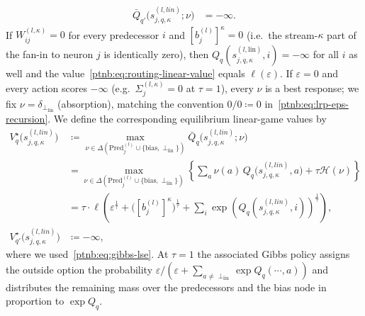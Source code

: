\begin{definition}
\begin{align}
    \bar Q_{q'} \bigl( s_{j,q,\kappa}^{(l, lin)};\nu \bigr)
    &= -\infty.
\end{align}
If $W_{ij}^{(l,\kappa)} = 0$ for every predecessor $i$ and $[b_j^{(l)}]^\kappa = 0$ (i.e.\ the
stream-$\kappa$ part of the fan-in to neuron $j$ is identically zero), then
$Q_q(s_{j,q,\kappa}^{(l,\mathrm{lin})},i) = -\infty$ for all $i$ as well and the
value~\eqref{ptnb:eq:routing-linear-value} equals $\ell(\varepsilon)$. If $\varepsilon=0$ and every
action scores $-\infty$ (e.g.\ $\Sigma_j^{(l,\kappa)}=0$ at $\tau=1$), every $\nu$ is a best
response; we fix $\nu=\delta_{\perp_{\mathrm{lin}}}$ (absorption), matching the convention
$0/0\coloneqq0$ in~\eqref{ptnb:eq:lrp-eps-recursion}.
We define the corresponding equilibrium linear-game values by
\begin{align}\label{ptnb:eq:routing-linear-value}
    V^\star_q \bigl( s_{j,q,\kappa}^{(l, lin)} \bigr)
    &\coloneqq
    \max_{\nu \in \Delta(\mathrm{Pred}_j^{(l)} \cup \{\mathrm{bias}, \perp_{\mathrm{lin}}\})}
    \bar Q_q\bigl(s_{j,q,\kappa}^{(l, lin)};\nu\bigr) \nonumber \\
    &=
    \max_{\nu \in \Delta(\mathrm{Pred}_j^{(l)} \cup \{\mathrm{bias}, \perp_{\mathrm{lin}}\})}
    \left\{
    \sum_{a} \nu(a)\, Q_q \bigl( s_{j,q,\kappa}^{(l, lin)}, a \bigr)
    + \tau \mathcal{H}(\nu)
    \right\} \nonumber \\
    &=
    \tau \cdot \ell \left( \varepsilon^{ \frac{1}{\tau} } +
    \bigl([b_j^{(l)}]^\kappa\bigr)^{\frac{1}{\tau}} + \sum_i \exp\left( Q_q(s_{j,q,\kappa}^{(l, lin)},
    i) \right)^{ \frac{ 1 }{ \tau } } \right), \\
    V^\star_{q'} \bigl( s_{j,q,\kappa}^{(l, lin)} \bigr)
    &\coloneqq -\infty,
\end{align}
where we used~\eqref{ptnb:eq:gibbs-lse}. At $\tau = 1$ the associated Gibbs policy assigns the outside
option the probability $\varepsilon / (\varepsilon + \sum_{a \neq \perp_{\mathrm{lin}}} \exp
    Q_q(\cdots, a))$ and distributes the remaining mass over the predecessors and the bias node in
proportion to $\exp Q_q$.


\end{definition}
